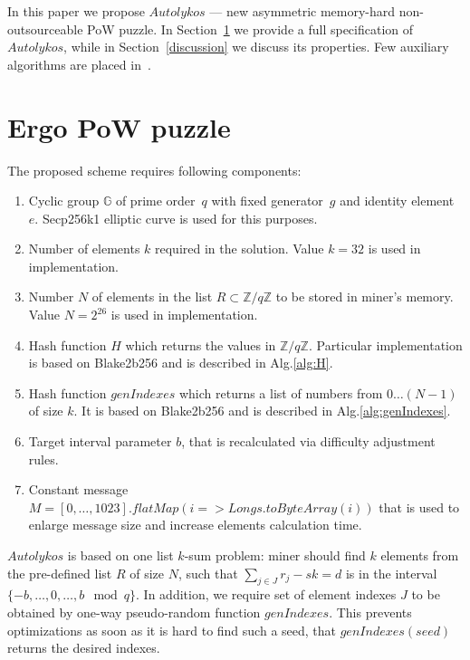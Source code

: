 \documentclass[]{article}
\newcommand{\Name}{$Autolykos$}
\begin{document}
    In this paper we propose \Name{} --- new asymmetric memory-hard non-outsourceable PoW puzzle.
    In Section~\ref{puzzle} we provide a full
    specification of \Name, while in Section~\ref{discussion} we discuss its
    properties. Few auxiliary algorithms are placed in~.

    \section{Ergo PoW puzzle}
    \label{puzzle}

    The proposed scheme requires following components:
    \begin{enumerate}
        \item Cyclic group $\mathbb{G}$ of prime order~$q$ with fixed generator~$g$
        and identity element~$e$.
        Secp256k1 elliptic curve is used for this purposes.
        \item Number of elements $k$ required in the solution. Value $k=32$ is used in
            implementation.
        \item Number $N$ of elements in the list
            $R\subset\mathbb{Z}/q\mathbb{Z}$ to be stored in miner's memory.
            Value $N=2^{26}$ is used in implementation.
        \item Hash function $H$ which returns the values in $\mathbb{Z}/q\mathbb{Z}$.
        Particular implementation is based on Blake2b256 and is described in Alg.\ref{alg:H}.
        \item Hash function $genIndexes$ which returns a list of numbers from
            $0\dots(N-1)$ of size $k$.
        It is based on Blake2b256 and is described in Alg.\ref{alg:genIndexes}.
        \item Target interval parameter $b$, that is recalculated via difficulty adjustment rules.
        \item Constant message $M=[0,\dots,1023].flatMap(i => Longs.toByteArray(i))$ that is used to enlarge message size and increase elements calculation time.
    \end{enumerate}

    \Name{} is based on one list $k$-sum problem: miner should find
    $k$ elements from the pre-defined list $R$ of size $N$, such that
    $\sum_{j \in J} r_{j} - sk = d$ is in the interval $\{-b,\dots,0,\dots,b\mod q\}$.
    In addition, we require set of element indexes $J$ to be obtained
    by one-way pseudo-random function $genIndexes$. This prevents optimizations as
    soon as it is hard to find such a seed,
    that $genIndexes(seed)$ returns the desired indexes.
\end{document}
